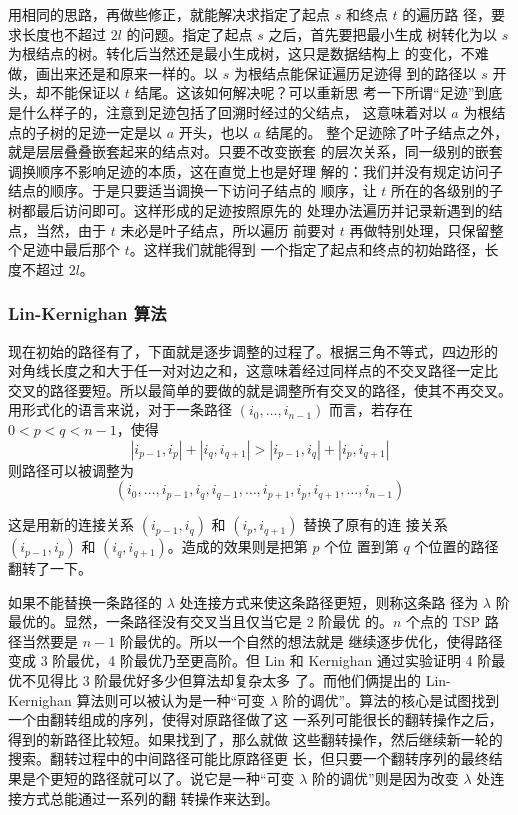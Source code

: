 \documentclass[cs4size,a4paper,adobefonts]{ctexart}
\begin{document}
用相同的思路，再做些修正，就能解决求指定了起点 $s$ 和终点 $t$ 的遍历路
径，要求长度也不超过 $2l$ 的问题。指定了起点 $s$ 之后，首先要把最小生成
树转化为以 $s$ 为根结点的树。转化后当然还是最小生成树，这只是数据结构上
的变化，不难做，画出来还是和原来一样的。以 $s$ 为根结点能保证遍历足迹得
到的路径以 $s$ 开头，却不能保证以 $t$ 结尾。这该如何解决呢？可以重新思
考一下所谓“足迹”到底是什么样子的，注意到足迹包括了回溯时经过的父结点，
这意味着对以 $a$ 为根结点的子树的足迹一定是以 $a$ 开头，也以 $a$ 结尾的。
整个足迹除了叶子结点之外，就是层层叠叠嵌套起来的结点对。只要不改变嵌套
的层次关系，同一级别的嵌套调换顺序不影响足迹的本质，这在直觉上也是好理
解的：我们并没有规定访问子结点的顺序。于是只要适当调换一下访问子结点的
顺序，让 $t$ 所在的各级别的子树都最后访问即可。这样形成的足迹按照原先的
处理办法遍历并记录新遇到的结点，当然，由于 $t$ 未必是叶子结点，所以遍历
前要对 $t$ 再做特别处理，只保留整个足迹中最后那个 $t$。这样我们就能得到
一个指定了起点和终点的初始路径，长度不超过 $2l$。

\subsubsection{Lin-Kernighan 算法}
现在初始的路径有了，下面就是逐步调整的过程了。根据三角不等式，四边形的
对角线长度之和大于任一对对边之和，这意味着经过同样点的不交叉路径一定比
交叉的路径要短。所以最简单的要做的就是调整所有交叉的路径，使其不再交叉。
用形式化的语言来说，对于一条路径 $(i_0,\dots,i_{n-1})$ 而言，若存在
$0< p < q < n-1$，使得
\begin{equation}
  |i_{p-1},i_p| + |i_q,i_{q+1}| > |i_{p-1},i_q| + |i_p,i_{q+1}|
\end{equation}
则路径可以被调整为
\begin{equation}\label{eq:pqOpt}
  (i_0,\dots,i_{p-1},i_q,i_{q-1},\dots,i_{p+1},i_p,i_{q+1},\dots,i_{n-1})
\end{equation}

这是用新的连接关系 $(i_{p-1},i_q)$ 和 $(i_p,i_{q+1})$ 替换了原有的连
接关系 $(i_{p-1},i_p)$ 和 $(i_q,i_{q+1})$。造成的效果则是把第 $p$ 个位
置到第 $q$ 个位置的路径翻转了一下。

如果不能替换一条路径的 $\lambda$ 处连接方式来使这条路径更短，则称这条路
径为 $\lambda$ 阶最优的。显然，一条路径没有交叉当且仅当它是 $2$ 阶最优
的。$n$ 个点的 TSP 路径当然要是 $n-1$ 阶最优的。所以一个自然的想法就是
继续逐步优化，使得路径变成 3 阶最优，4 阶最优乃至更高阶。但 Lin 和
Kernighan 通过实验证明 4 阶最优不见得比 3 阶最优好多少但算法却复杂太多
了。而他们俩提出的 Lin-Kernighan 算法则可以被认为是一种“可变 $\lambda$
阶的调优”。算法的核心是试图找到一个由翻转组成的序列，使得对原路径做了这
一系列可能很长的翻转操作之后，得到的新路径比较短。如果找到了，那么就做
这些翻转操作，然后继续新一轮的搜索。翻转过程中的中间路径可能比原路径更
长，但只要一个翻转序列的最终结果是个更短的路径就可以了。说它是一种“可变
$\lambda$ 阶的调优”则是因为改变 $\lambda$ 处连接方式总能通过一系列的翻
转操作来达到。
\end{document}
